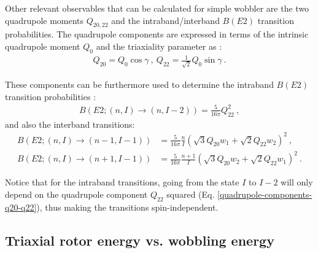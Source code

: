 Other relevant observables that can be calculated for simple wobbler are the two quadrupole moments $Q_{20,22}$ and the intraband/interband $B(E2)$ transition probabilities. The quadrupole components are expressed in terms of the intrinsic quadrupole moment $Q_0$ and the triaxiality parameter as \cite{shoji2006microscopic}:
\begin{align}
    Q_{20}=Q_0\cos\gamma\ ,\ Q_{22}=\frac{1}{\sqrt{2}}Q_0\sin\gamma\ .
    \label{quadrupole-components-q20-q22}
\end{align}

These components can be furthermore used to determine the intraband $B(E2)$ transition probabilities \cite{wen2015wobbling}:
\begin{align}
    B(E2;(n,I)\to(n,I-2))=\frac{5}{16\pi}Q_{22}^2\ ,
    \label{intraband-probability-simple-wobbler}
\end{align}
and also the interband transitions:
\begin{align}
    B(E2;(n,I)\to(n-1,I-1))&=\frac{5}{16\pi}\frac{n}{I}\left(\sqrt{3}Q_{20}w_1+\sqrt{2}Q_{22}w_2\right)^2\ , \label{interband-probability-simple-wobbler-1}\\
    B(E2;(n,I)\to(n+1,I-1))&=\frac{5}{16\pi}\frac{n+1}{I}\left(\sqrt{3}Q_{20}w_2+\sqrt{2}Q_{22}w_1\right)^2\ .
    \label{interband-probability-simple-wobbler-2}
\end{align}

Notice that for the intraband transitions, going from the state $I$ to $I-2$ will only depend on the quadrupole component $Q_{22}$ squared (Eq. \ref{quadrupole-components-q20-q22}), thus making the transitions spin-independent.

\subsection{Triaxial rotor energy vs. wobbling energy}

